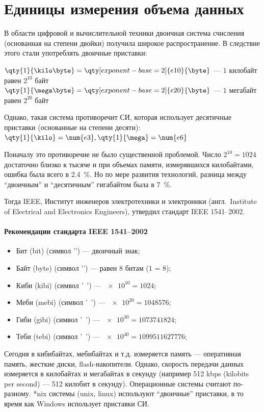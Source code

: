 \section{Единицы измерения объема данных}\label{sec:data-measurement-units}

В области цифровой и вычислительной техники двоичная система счисления (основанная на степени двойки) получила широкое распространение. В следствие этого стали употреблять двоичные приставки:

\noindent
$\qty{1}{\KB} = \qty[exponent-base=2]{e10}{\B}$ --- $1$ килобайт равен $2^{10}$ байт \\
$\qty{1}{\MB} = \qty[exponent-base=2]{e20}{\B}$ --- $1$ мегабайт равен $2^{20}$ байт

Однако, такая система противоречит СИ, которая использует десятичные приставки (основанные на степени десяти): \\
$\qty{1}{\kilo\relax} = \num{e3}, \qty{1}{\mega\relax} = \num{e6}$

Поначалу это противоречие не было существенной проблемой.
Число $2^{10} = 1024$ достаточно близко к тысяче и при объемах памяти, измерявшихся килобайтами, ошибка была всего в \qty{2.4}{\percent}.
Но по мере развития технологий, разница между \enquote{двоичным} и \enquote{десятичным} гигабайтом была в \qty{7}{\percent}.

Тогда IEEE, Институт инженеров электротехники и электроники (англ.\ Institute of Electrical and Electronics Engineers), утвердил стандарт IEEE 1541--2002.

\paragraph{Рекомендации стандарта IEEE 1541--2002}\label{par:ieee-1541-2002}
\begin{itemize}
    \item Бит (bit) (символ '\unit{\bit}') --- двоичный знак;
    \item Байт (byte) (символ '\unit{\byte}') --- равен 8 битам (\qty{1}{\byte} = \qty{8}{\bit});
    \item Киби (kibi) (символ '\unit{\kibi\relax}') --- $\num[exponent-base=2]{e10} = \num{1024}$;
    \item Меби (mebi) (символ '\unit{\mebi\relax}') --- $\num[exponent-base=2]{e20} = \num{1048576}$;
    \item Гиби (gibi) (символ '\unit{\gibi\relax}') --- $\num[exponent-base=2]{e30} = \num{1073741824}$;
    \item Теби (tebi) (символ '\unit{\tebi\relax}') --- $\num[exponent-base=2]{e40} = \num{1099511627776}$;
\end{itemize}

Сегодня в кибибайтах, мебибайтах и т.д. измеряется память --- оперативная память, жесткие диски, flash-накопители.
Однако, скорость передачи данных измеряется в килобайтах и мегабайтах в секунду (например 512 kbps (kilobits per second) --- 512 килобит в секунду).
Операционные системы считают по-разному.
*nix системы (unix, linux) используют \enquote{двоичные} приставки, в то время как Windows использует приставки СИ.
